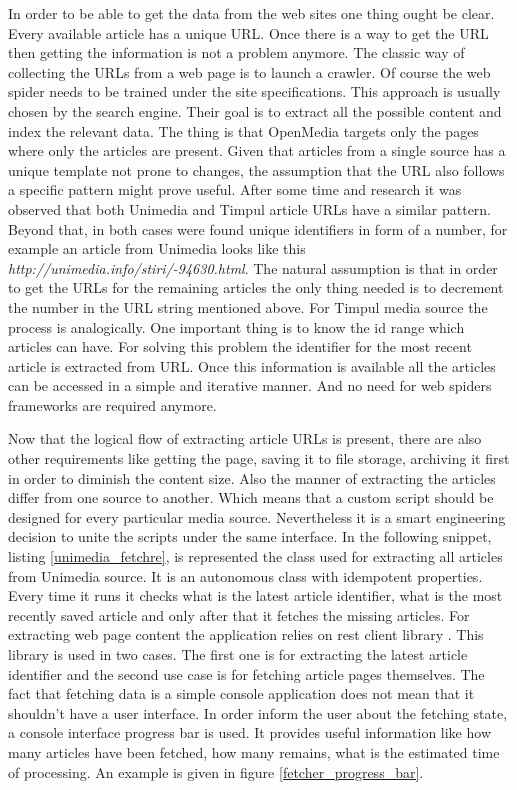 In order to be able to get the data from the web sites one thing ought be clear. Every available article has a unique URL. Once there is a way to get the URL then getting the information is not a problem anymore. The classic way of collecting the URLs from a web page is to launch a crawler. Of course the web spider needs to be trained under the site specifications. This approach is usually chosen by the search engine. Their goal is to extract all the possible content and index the relevant data. The thing is that OpenMedia targets only the pages where only the articles are present. Given that articles from a single source has a unique template not prone to changes, the assumption that the URL also follows a specific pattern might prove useful. After some time and research it was observed that both Unimedia and Timpul article URLs have a similar pattern. Beyond that, in both cases were found unique identifiers in form of a number, for example an article from Unimedia looks like this \emph{http://unimedia.info/stiri/-94630.html}. The natural assumption is that in order to get the URLs for the remaining articles the only thing needed is to decrement the number in the URL string mentioned above. For Timpul media source the process is analogically. One important thing is to know the id range which articles can have. For solving this problem the identifier for the most recent article is extracted from URL. Once this information is available all the articles can be accessed in a simple and iterative manner. And no need for web spiders frameworks are required anymore.

Now that the logical flow of extracting article URLs is present, there are also other requirements like getting the page, saving it to file storage, archiving it first in order to diminish the content size. Also the manner of extracting the articles differ from one source to another. Which means that a custom script should be designed for every particular media source. Nevertheless it is a smart engineering decision to unite the scripts under the same interface. In the following snippet, listing \ref{unimedia_fetchre}, is represented the class used for extracting all articles from Unimedia source. It is an autonomous class with idempotent properties. Every time it runs it checks what is the latest article identifier, what is the most recently saved article and only after that it fetches the missing articles. For extracting web page content the application relies on rest client library \cite{rest_client_ruby}. This library is used in two cases. The first one is for extracting the latest article identifier and the second use case is for fetching article pages themselves. The fact that fetching data is a simple console application does not mean that it shouldn't have a user interface. In order inform the user about the fetching state, a console interface progress bar is used. It provides useful information like how many articles have been fetched, how many remains, what is the estimated time of processing. An example is given in figure \ref{fetcher_progress_bar}.

